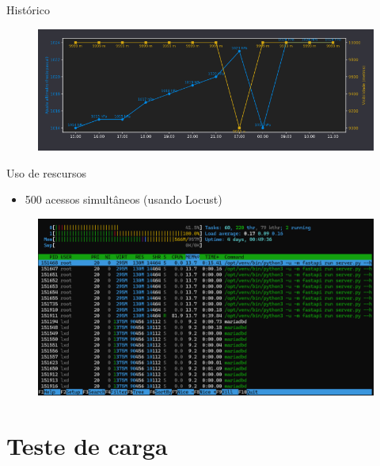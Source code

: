 \documentclass{beamer}
\begin{document}
\begin{frame}{Histórico}
    \begin{figure}[ht]
        \begin{center}
        \includegraphics[width=0.7\linewidth]{img/history-2.png}
        \label{fig:UI}
        \end{center}
    \end{figure}
\end{frame}

\begin{frame}{Uso de rescursos}
    \begin{itemize}
        \item 500 acessos simultâneos (usando Locust)
    \end{itemize}
    
    \begin{figure}[ht]
        \begin{center}
        \includegraphics[width=0.8\linewidth]{img/server-500-acessos.png}
        \label{fig:arquitetura}
        \end{center}
    \end{figure}
\end{frame}

\section{Teste de carga}
\end{document}
